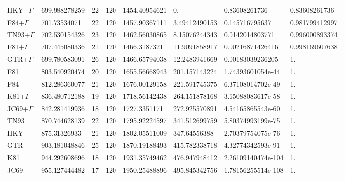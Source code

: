 \begin{refsection}
\begin{table}[H]
\begin{center}
\begin{tabular}{llllllll}
HKY+$\Gamma$ & \scriptsize 699.988278259 & \scriptsize 22 & \scriptsize 120 & \scriptsize 1454.40954621 & \scriptsize 0. & \scriptsize 0.83608261736 & \scriptsize 0.83608261736 \\
F84+$\Gamma$ & \scriptsize 701.73534071 & \scriptsize 22 & \scriptsize 120 & \scriptsize 1457.90367111 & \scriptsize 3.49412490153 & \scriptsize 0.145716795637 & \scriptsize 0.981799412997 \\
TN93+$\Gamma$ &\scriptsize  702.530154326 & \scriptsize 23 & \scriptsize 120 & \scriptsize 1462.56030865 & \scriptsize 8.15076244343 &\scriptsize  0.0142014803771 & \scriptsize 0.996000893374 \\
F81+$\Gamma$ & \scriptsize 707.445080336 & \scriptsize 21 & \scriptsize 120 & \scriptsize 1466.3187321 & \scriptsize 11.9091858917 & \scriptsize 0.00216871426416 & \scriptsize 0.998169607638 \\
GTR+$\Gamma$ & \scriptsize 699.780583091 & \scriptsize 26 & \scriptsize 120 & \scriptsize 1466.65794038 & \scriptsize 12.2483941669 & \scriptsize 0.00183039236205 & \scriptsize 1. \\
F81 & \scriptsize 803.540920474 & \scriptsize 20 & \scriptsize 120 & \scriptsize 1655.56668943 & \scriptsize 201.157143224 & \scriptsize 1.74393601054e-44 & \scriptsize 1. \\
F84 & \scriptsize 812.286360077 & \scriptsize 21 & \scriptsize 120 & \scriptsize 1676.00129158 & \scriptsize 221.591745375 & \scriptsize 6.37108014702e-49 & \scriptsize 1. \\
K81+$\Gamma$ & \scriptsize 836.480712188 & \scriptsize 19 & \scriptsize 120 & \scriptsize 1718.56142438 & \scriptsize 264.151878168 & \scriptsize 3.65088083617e-58 & \scriptsize 1. \\
JC69+$\Gamma$ & \scriptsize 842.281419936 & \scriptsize 18 & \scriptsize 120 & \scriptsize 1727.3351171 & \scriptsize 272.925570891 & \scriptsize 4.54165865543e-60 & \scriptsize 1. \\
TN93 & \scriptsize 870.744628139 & \scriptsize 22 & \scriptsize 120 & \scriptsize 1795.92224597 & \scriptsize 341.512699759 & \scriptsize 5.80374993199e-75 & \scriptsize 1. \\
HKY & \scriptsize 875.31326933 & \scriptsize 21 & \scriptsize 120 & \scriptsize 1802.05511009 & \scriptsize 347.64556388 & \scriptsize 2.70379754075e-76 & \scriptsize 1. \\
GTR & \scriptsize 903.181048846 & \scriptsize 25 & \scriptsize 120 & \scriptsize 1870.19188493 & \scriptsize 415.782338718 & \scriptsize 4.32774342593e-91 & \scriptsize 1. \\
K81 & \scriptsize 944.292608696 & \scriptsize 18 & \scriptsize 120 & \scriptsize 1931.35749462 & \scriptsize 476.947948412 & \scriptsize 2.26109140474e-104 & \scriptsize 1. \\
JC69 & \scriptsize 955.127444482 & \scriptsize 17 & \scriptsize 120 & \scriptsize 1950.25488896 & \scriptsize 495.845342756 & \scriptsize 1.78156255514e-108 & \scriptsize 1. \\\hline


\end{tabular}
\end{center}
\end{table}
\end{refsection}
